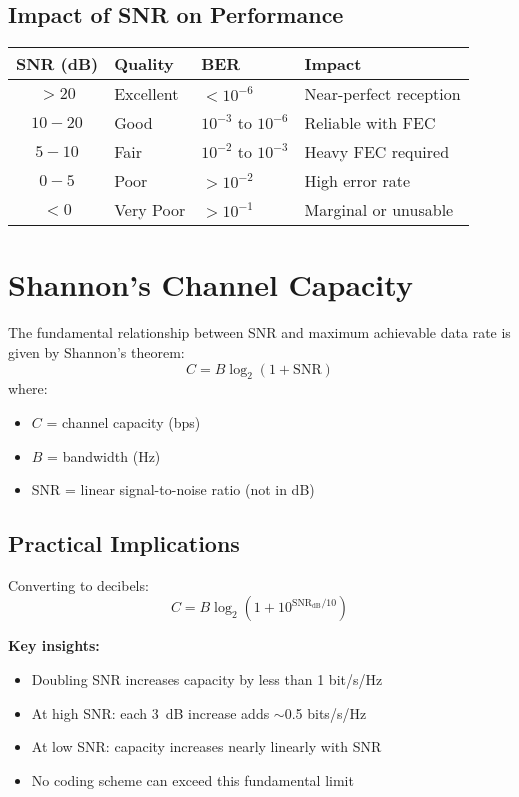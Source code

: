 \subsection{Impact of SNR on Performance}

\begin{center}
\begin{tabular}{clll}
\toprule
\textbf{SNR (dB)} & \textbf{Quality} & \textbf{BER} & \textbf{Impact} \\
\midrule
$>20$ & Excellent & $<10^{-6}$ & Near-perfect reception \\
$10-20$ & Good & $10^{-3}$ to $10^{-6}$ & Reliable with FEC \\
$5-10$ & Fair & $10^{-2}$ to $10^{-3}$ & Heavy FEC required \\
$0-5$ & Poor & $>10^{-2}$ & High error rate \\
$<0$ & Very Poor & $>10^{-1}$ & Marginal or unusable \\
\bottomrule
\end{tabular}
\end{center}

\section{Shannon's Channel Capacity}

The fundamental relationship between SNR and maximum achievable data rate is given by Shannon's theorem:
\begin{equation}
C = B \log_2(1 + \mathrm{SNR})
\end{equation}
where:
\begin{itemize}
\item $C$ = channel capacity (bps)
\item $B$ = bandwidth (Hz)
\item SNR = linear signal-to-noise ratio (not in dB)
\end{itemize}

\subsection{Practical Implications}

Converting to decibels:
\begin{equation}
C = B \log_2\left(1 + 10^{\mathrm{SNR_{dB}}/10}\right)
\end{equation}

\textbf{Key insights:}
\begin{itemize}
\item Doubling SNR increases capacity by less than 1 bit/s/Hz
\item At high SNR: each 3~dB increase adds $\sim$0.5 bits/s/Hz
\item At low SNR: capacity increases nearly linearly with SNR
\item No coding scheme can exceed this fundamental limit
\end{itemize}

